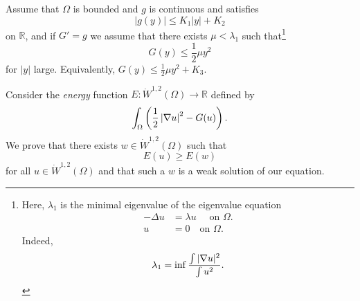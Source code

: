 \documentclass[10pt, oneside, reqno]{amsart}
\theoremstyle{plain}%
\numberwithin{equation}{section}
\theoremstyle{definition}
\theoremstyle{remark}
\newcommand{\R}{\mathbb{R}}
\begin{document}
Assume that $\Omega$ is bounded and $g$ is continuous and satisfies \[
		\left| g(y) \right| \leq K_1 | y | + K_2
	\] on $\R$, and if $G' = g$ we assume that there exists $\mu < \lambda_1$ such that\footnote{Here, $\lambda_1$ is the minimal eigenvalue of the eigenvalue equation \begin{align*}
			-\Delta u &= \lambda u \quad \text{ on $\Omega$.} \\
			u &= 0 \quad \text{on $\Omega$}.
		\end{align*}  Indeed, \[
			\lambda_1 = \inf \frac{\int |\nabla u |^2}{\int u^2}.
		\]
		} \[
		G(y) \leq \frac{1}{2} \mu y^2 
	\]  for $|y|$ large.   Equivalently, $G(y) \leq \frac{1}{2} \mu y^2 + K_3$.

Consider the \emph{energy} function $E: \dot W^{1, 2}(\Omega) \rightarrow \R$ defined by \begin{equation}
	\label{eq:energy}
	\int_\Omega \left( \frac{1}{2} \left| \nabla u \right|^2 - G(u) \right).
\end{equation}  We prove that there exists $w \in \dot W^{1, 2}(\Omega)$ such that \[
	E(u) \geq E(w)
\] for all $u \in \dot W^{1, 2}(\Omega)$ and that such a $w$ is a weak solution of our equation.  
\end{document}
